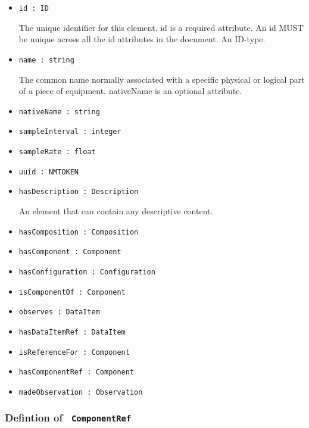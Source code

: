 \begin{itemize}
\item \texttt{id : ID}

\tab The unique identifier for this element.
id is a required attribute.
An id MUST be unique across all the id attributes in the document.
An ID-type.

\item \texttt{name : string}

\tab The common name normally associated with a specific physical or logical part of a piece of equipment.
nativeName is an optional attribute.

\item \texttt{nativeName : string}

\item \texttt{sampleInterval : integer}

\item \texttt{sampleRate : float}

\item \texttt{uuid : NMTOKEN}

\item \texttt{hasDescription : Description}

\tab An element that can contain any descriptive content.

\item \texttt{hasComposition : Composition}

\item \texttt{hasComponent : Component}

\item \texttt{hasConfiguration : Configuration}

\item \texttt{isComponentOf : Component}

\item \texttt{observes : DataItem}

\item \texttt{hasDataItemRef : DataItem}

\item \texttt{isReferenceFor : Component}

\item \texttt{hasComponentRef : Component}

\item \texttt{madeObservation : Observation}

\end{itemize}
\FloatBarrier
\subsubsection{Defintion of \texttt{ ComponentRef}}
  \label{type:ComponentRef}

